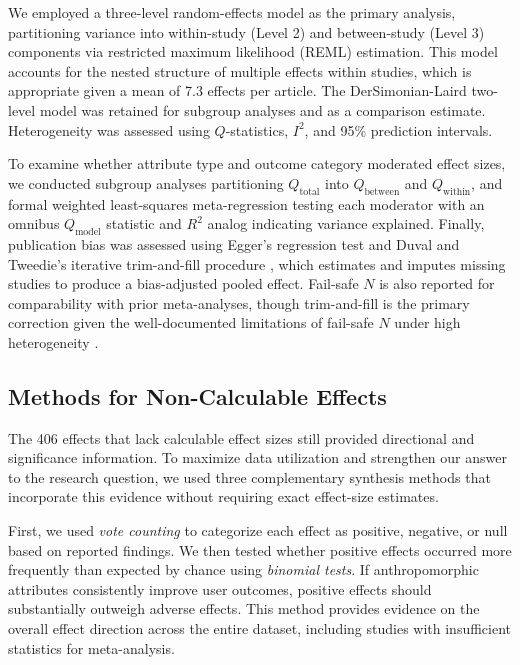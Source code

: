 \documentclass[lettersize,journal]{IEEEtran}
\begin{document}
We employed a three-level random-effects model \cite{vanden2013three} as the primary analysis, partitioning variance into within-study (Level 2) and between-study (Level 3) components via restricted maximum likelihood (REML) estimation. This model accounts for the nested structure of multiple effects within studies, which is appropriate given a mean of 7.3 effects per article. The DerSimonian-Laird two-level model \cite{dersimonian1986meta} was retained for subgroup analyses and as a comparison estimate. Heterogeneity was assessed using $Q$-statistics, $I^2$, and 95\% prediction intervals.

To examine whether attribute type and outcome category moderated effect sizes, we conducted subgroup analyses partitioning $Q_{\text{total}}$ into $Q_{\text{between}}$ and $Q_{\text{within}}$, and formal weighted least-squares meta-regression testing each moderator with an omnibus $Q_{\text{model}}$ statistic and $R^2$ analog indicating variance explained.
Finally, publication bias was assessed using Egger's regression test \cite{egger1997bias} and Duval and Tweedie's iterative trim-and-fill procedure \cite{duval2000trim}, which estimates and imputes missing studies to produce a bias-adjusted pooled effect. Fail-safe $N$ \cite{rosenthal1979file} is also reported for comparability with prior meta-analyses, though trim-and-fill is the primary correction given the well-documented limitations of fail-safe $N$ under high heterogeneity \cite{page2024missingevidence}.

\subsection{Methods for Non-Calculable Effects}

The 406 effects that lack calculable effect sizes still provided directional and significance information. To maximize data utilization and strengthen our answer to the research question, we used three complementary synthesis methods that incorporate this evidence without requiring exact effect-size estimates.

First, we used \textit{vote counting} to categorize each effect as positive, negative, or null based on reported findings. We then tested whether positive effects occurred more frequently than expected by chance using \textit{binomial tests}. If anthropomorphic attributes consistently improve user outcomes, positive effects should substantially outweigh adverse effects. This method provides evidence on the overall effect direction across the entire dataset, including studies with insufficient statistics for meta-analysis. 
\end{document}
